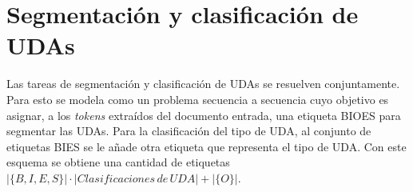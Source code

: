 \documentclass[a4paper,11pt,twocolumn,twoside]{article}
\begin{document}
\section{Segmentación y clasificación de UDAs}

Las tareas de segmentación y clasificación de UDAs se resuelven conjuntamente. Para esto se modela 
como un problema secuencia a secuencia cuyo objetivo es asignar, a los \textit{tokens} extraídos del documento 
entrada, una etiqueta BIOES para segmentar las UDAs. Para la clasificación del tipo 
de UDA, al conjunto de etiquetas BIES se le añade otra etiqueta que representa el tipo de UDA. Con 
este esquema se obtiene una cantidad de etiquetas $|\{B,I,E,S\}| \cdot |Clasificaciones \, de \, UDA| + |\{O\}|$.


\end{document}
